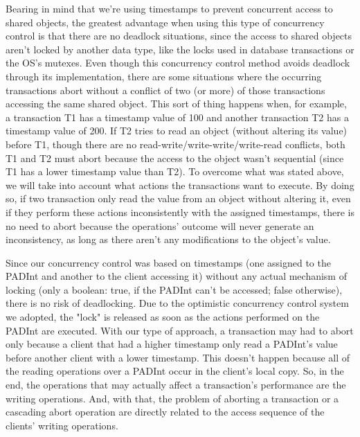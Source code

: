 \documentclass[times, 10pt,twocolumn]{article}
\begin{document}
Bearing in mind that we're using timestamps to prevent concurrent access to shared objects, the greatest advantage when using this type of concurrency control is that there are no deadlock situations, since the access to shared objects aren't locked by another data type, like the locks used in database transactions or the OS's mutexes.
Even though this concurrency control method avoids deadlock through its implementation, there are some situations where the occurring transactions abort without a conflict of two (or more) of those transactions accessing the same shared object. This sort of thing happens when, for example, a transaction T1 has a timestamp value of 100 and another transaction T2 has a timestamp value of 200. If T2 tries to read an object (without altering its value) before T1, though there are no read-write/write-write/write-read conflicts, both T1 and T2 must abort because the access to the object wasn't sequential (since T1 has a lower timestamp value than T2).
To overcome what was stated above, we will take into account what actions the transactions want to execute. By doing so, if two transaction only read the value from an object without altering it, even if they perform these actions inconsistently with the assigned timestamps, there is no need to abort because the operations' outcome will never generate an inconsistency, as long as there aren't any modifications to the object's value.

Since our concurrency control was based on timestamps (one assigned to the PADInt and another to the client accessing it) without any actual mechanism of locking (only a boolean: true, if the PADInt can't be accessed; false otherwise), there is no risk of deadlocking. Due to the optimistic concurrency control system we adopted, the "lock" is released as soon as the actions performed on the PADInt are executed.
With our type of approach, a transaction may had to abort only because a client that had a higher timestamp only read a PADInt's value before another client with a lower timestamp. This doesn't happen because all of the reading operations over a PADInt occur in the client's local copy. So, in the end, the operations that may actually affect a transaction's performance are the writing operations. And, with that, the problem of aborting a transaction or a cascading abort operation are directly related to the access sequence of the clients' writing operations.
\end{document}
